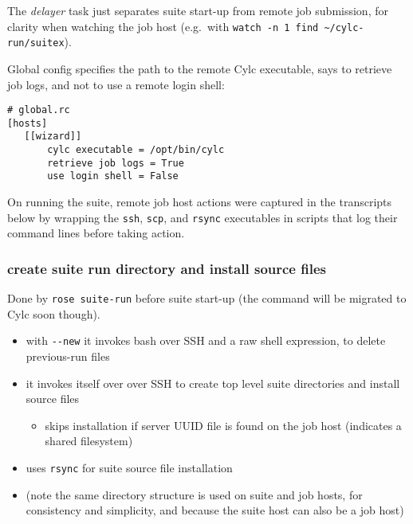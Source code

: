 The {\em delayer} task just separates suite start-up from remote job
submission, for clarity when watching the job host (e.g.\ with
\lstinline=watch -n 1 find ~/cylc-run/suitex=).

Global config specifies the path to the remote Cylc executable, says
to retrieve job logs, and not to use a remote login shell:
\begin{lstlisting}
# global.rc
[hosts]
   [[wizard]]
       cylc executable = /opt/bin/cylc
       retrieve job logs = True
       use login shell = False
\end{lstlisting}

On running the suite, remote job host actions were captured in the transcripts
below by wrapping the \lstinline=ssh=, \lstinline=scp=, and \lstinline=rsync=
executables in scripts that log their command lines before taking action.

\renewcommand*\DTstylecomment{\normalfont\ttfamily\color{comments}}
\renewcommand*\DTstyle{\bf\ttfamily\textcolor{identifiers}}

\subsubsection{create suite run directory and install source files}

Done by \lstinline=rose suite-run= before suite start-up
(the command will be migrated to Cylc soon though).

\begin{itemize}
  \item with \lstinline=--new= it invokes bash over SSH and a raw shell
    expression, to delete previous-run files
  \item it invokes itself over over SSH to create top level suite directories
    and install source files
    \begin{itemize}
      \item skips installation if server UUID file is found on the job host
        (indicates a shared filesystem)
    \end{itemize}
  \item uses \lstinline=rsync= for suite source file installation
  \item (note the same directory structure is used on suite and job hosts, for
    consistency and simplicity, and because the suite host can also be a job host)
\end{itemize}

\lstset{breaklines=true}
\lstset{language=jobhosts}

